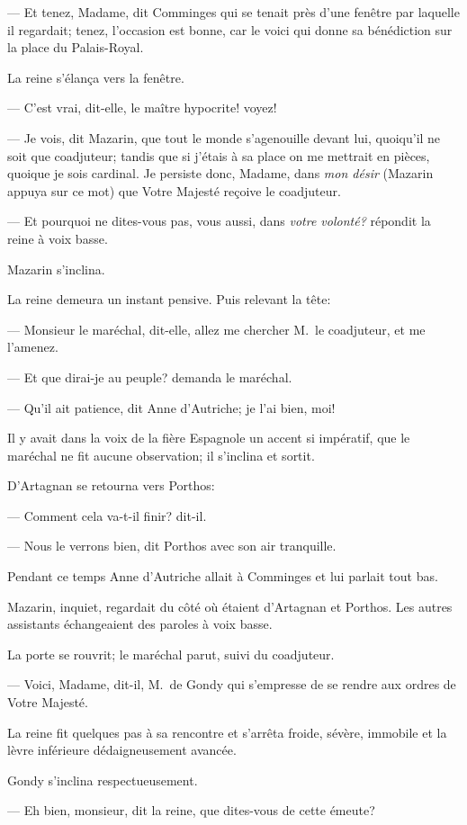 — Et tenez, Madame, dit Comminges qui se tenait près d'une fenêtre par laquelle il regardait; tenez, l'occasion est bonne, car le voici qui donne sa bénédiction sur la place du Palais-Royal.

La reine s'élança vers la fenêtre.

— C'est vrai, dit-elle, le maître hypocrite! voyez!

— Je vois, dit Mazarin, que tout le monde s'agenouille devant lui, quoiqu'il ne soit que coadjuteur; tandis que si j'étais à sa place on me mettrait en pièces, quoique je sois cardinal. Je persiste donc, Madame, dans \textit{mon désir} (Mazarin appuya sur ce mot) que Votre Majesté reçoive le coadjuteur.

— Et pourquoi ne dites-vous pas, vous aussi, dans \textit{votre volonté?} répondit la reine à voix basse.

Mazarin s'inclina.

La reine demeura un instant pensive. Puis relevant la tête:

— Monsieur le maréchal, dit-elle, allez me chercher M.~le coadjuteur, et me l'amenez.

— Et que dirai-je au peuple? demanda le maréchal.

— Qu'il ait patience, dit Anne d'Autriche; je l'ai bien, moi!

Il y avait dans la voix de la fière Espagnole un accent si impératif, que le maréchal ne fit aucune observation; il s'inclina et sortit.

D'Artagnan se retourna vers Porthos:

— Comment cela va-t-il finir? dit-il.

— Nous le verrons bien, dit Porthos avec son air tranquille.

Pendant ce temps Anne d'Autriche allait à Comminges et lui parlait tout bas.

Mazarin, inquiet, regardait du côté où étaient d'Artagnan et Porthos.
Les autres assistants échangeaient des paroles à voix basse.

La porte se rouvrit; le maréchal parut, suivi du coadjuteur.

— Voici, Madame, dit-il, M.~de Gondy qui s'empresse de se rendre aux ordres de Votre Majesté.

La reine fit quelques pas à sa rencontre et s'arrêta froide, sévère, immobile et la lèvre inférieure dédaigneusement avancée.

Gondy s'inclina respectueusement.

— Eh bien, monsieur, dit la reine, que dites-vous de cette émeute?

